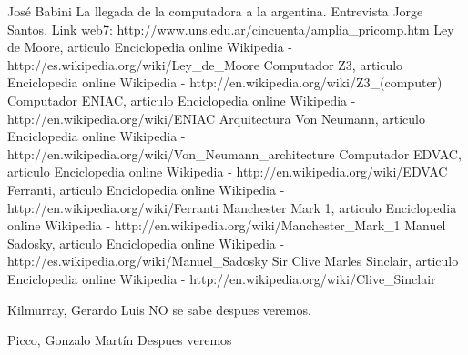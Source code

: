 \documentclass[%
 	final,
%
	notitlepage,
	narroweqnarray,
	inline,
 	twoside,
	]{ieee}
\newcommand{\link}[1]{\textit{}{#1}}
\begin{document}
\begin{thebibliography}{1}

 Jos\'e Babini La llegada de la computadora a la argentina.
 Entrevista Jorge Santos.
 Link web7: \link{http://www.uns.edu.ar/cincuenta/amplia\_pricomp.htm}
 Ley de Moore, articulo Enciclopedia online Wikipedia -\link{http://es.wikipedia.org/wiki/Ley\_de\_Moore}
 Computador Z3, articulo Enciclopedia online Wikipedia - \link{http://en.wikipedia.org/wiki/Z3\_(computer)}
 Computador ENIAC, articulo Enciclopedia online Wikipedia - \link{http://en.wikipedia.org/wiki/ENIAC}
 Arquitectura Von Neumann, articulo Enciclopedia online Wikipedia - \link{http://en.wikipedia.org/wiki/Von\_Neumann\_architecture}
 Computador EDVAC, articulo Enciclopedia online Wikipedia - \link{http://en.wikipedia.org/wiki/EDVAC}
 Ferranti, articulo Enciclopedia online Wikipedia - \link{http://en.wikipedia.org/wiki/Ferranti}
 Manchester Mark 1, articulo Enciclopedia online Wikipedia - \link{http://en.wikipedia.org/wiki/Manchester\_Mark\_1}
 Manuel Sadosky, articulo Enciclopedia online Wikipedia - \link{http://es.wikipedia.org/wiki/Manuel\_Sadosky}
 Sir Clive Marles Sinclair, articulo Enciclopedia online Wikipedia - \link{http://en.wikipedia.org/wiki/Clive\_Sinclair}


\end{thebibliography}


\begin{biography}{Kilmurray, Gerardo Luis} 
NO se sabe despues veremos.
\end{biography}


\begin{biography}{Picco, Gonzalo Mart\'in} 
Despues veremos
\end{biography}
\end{document}
